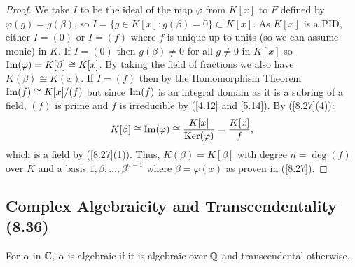 \begin{proof}
    We take $I$ to be the ideal of the map $\varphi$ from $K[x]$ to $F$ defined by
    $\varphi(g) = g(\beta)$, so $I = \{g \in K[x] : g(\beta) = 0\} \subset K[x]$.
    As $K[x]$ is a PID, either $I = (0)$ or $I = (f)$ where $f$ is unique up to units
    (so we can assume monic) in $K$.
    \bs
    If $I = (0)$ then $g(\beta) \neq 0$ for all $g \neq 0$ in $K[x]$ so 
    $\operatorname{Im}(\varphi) = K[\beta] \cong K[x]$. By taking the field of fractions we also
    have $K(\beta) \cong K(x)$.
    \bs
    If $I = (f)$ then by the Homomorphism Theorem $\operatorname{Im}(f) \cong K[x] / (f)$ 
    but since $\operatorname{Im}(f)$ is an integral domain as it is a subring of a field,
    $(f)$ is prime and $f$ is irreducible by (\ref{4.12} and \ref{5.14}).
    By (\ref{8.27}(4)): \begin{align*}
        K[\beta] \cong \operatorname{Im}(\varphi) \cong \frac{K[x]}{\operatorname{Ker}(\varphi)} = \frac{K[x]}{f},
    \end{align*} which is a field by (\ref{8.27}(1)). Thus, $K(\beta) = K[\beta]$
    with degree $n = \deg(f)$ over $K$ and a basis $1, \beta, \ldots, \beta^{n - 1}$
    where $\beta = \varphi(x)$ as proven in (\ref{8.27}).
\end{proof}

\subsection{Complex Algebraicity and Transcendentality (8.36)} \label{8.36}

For $\alpha$ in $\mathbb{C}$, $\alpha$ is algebraic if it is algebraic over $\mathbb{Q}$
and transcendental otherwise.
